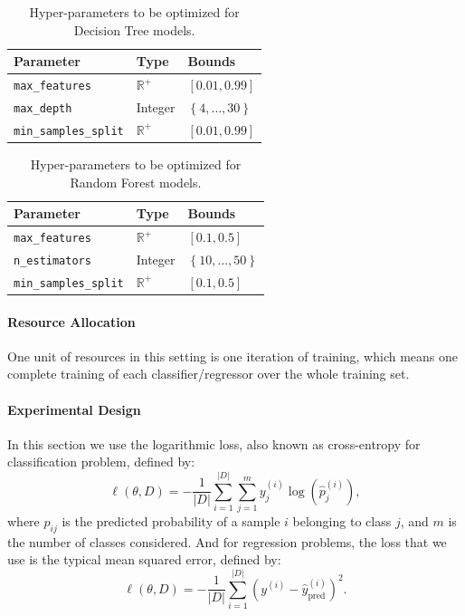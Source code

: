 \documentclass[runningheads,a4paper]{llncs}
\begin{document}
\begin{table}[ht]
\centering
\begin{tabular}{@{}lll@{}}
\toprule
\textbf{Parameter}             & \textbf{Type}  & \textbf{Bounds}                          \\ \midrule
\texttt{max\_features}      & $\mathbb{R}^+$ & $\left[0.01, 0.99\right]$   \\
\texttt{max\_depth}          & Integer        & $\left\lbrace 4, \dots, 30 \right\rbrace$ \\
\texttt{min\_samples\_split}  & $\mathbb{R}^+$  & $\left[0.01, 0.99\right]$
\end{tabular}
\caption{Hyper-parameters to be optimized for Decision Tree models.}
\label{treeparam}
\end{table}

\begin{table}[ht]
\centering
\begin{tabular}{@{}lll@{}}
\toprule
\textbf{Parameter}             & \textbf{Type}  & \textbf{Bounds}                          \\ \midrule
\texttt{max\_features}      & $\mathbb{R}^+$ & $\left[0.1, 0.5\right]$   \\
\texttt{n\_estimators}          & Integer        & $\left\lbrace 10, \dots, 50 \right\rbrace$ \\
\texttt{min\_samples\_split}  & $\mathbb{R}^+$  & $\left[0.1, 0.5\right]$
\end{tabular}
\caption{Hyper-parameters to be optimized for Random Forest models.}
\label{rfparam}
\end{table}

\paragraph{\textbf{Resource Allocation}} One unit of resources in this setting is one iteration of training, which means one complete training of each classifier/regressor over the whole training set.  

\paragraph{\textbf{Experimental Design}} In this section we use the logarithmic loss, also known as cross-entropy for classification problem, defined by:
\[
\ell(\theta, D) = - \frac{1}{|D|} \sum_{i=1}^{|D|} \sum_{j=1}^m y^{(i)}_{j}\log(\hat{p}^{(i)}_{j}),
\]
where $\hat{p}_{ij}$ is the predicted probability of a sample $i$ belonging to class $j$, and $m$ is the number of classes considered. And for regression problems, the loss that we use is the typical mean squared error, defined by:
\[
\ell(\theta, D) = - \frac{1}{|D|} \sum_{i=1}^{|D|} \left(y^{(i)} - \hat{y}^{(i)}_{\operatorname{pred}}\right)^2.
\]
\end{document}
